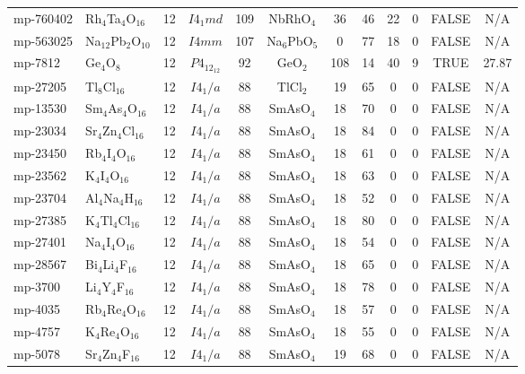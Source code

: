 {\begin{longtable}{llcccccccccc}
    mp-760402 & Rh$_{4}$Ta$_{4}$O$_{16}$ & 12    & $I4_1md$ & 109   & NbRhO$_{4}$ & 36    & 46    & 22    & 0     & FALSE & N/A \\
    mp-563025 & Na$_{12}$Pb$_{2}$O$_{10}$ & 12    & $I4mm$ & 107   & Na$_{6}$PbO$_{5}$ & 0     & 77    & 18    & 0     & FALSE & N/A \\
    mp-7812 & Ge$_{4}$O$_{8}$ & 12    & $P4_12_12$ & 92    & GeO$_{2}$ & 108   & 14    & 40    & 9     & TRUE  & 27.87  \\
    mp-27205 & Tl$_{8}$Cl$_{16}$ & 12    & $I4_1/a$ & 88    & TlCl$_{2}$ & 19    & 65    & 0     & 0     & FALSE & N/A \\
    mp-13530 & Sm$_{4}$As$_{4}$O$_{16}$ & 12    & $I4_1/a$ & 88    & SmAsO$_{4}$ & 18    & 70    & 0     & 0     & FALSE & N/A \\
    mp-23034 & Sr$_{4}$Zn$_{4}$Cl$_{16}$ & 12    & $I4_1/a$ & 88    & SmAsO$_{4}$ & 18    & 84    & 0     & 0     & FALSE & N/A \\
    mp-23450 & Rb$_{4}$I$_{4}$O$_{16}$ & 12    & $I4_1/a$ & 88    & SmAsO$_{4}$ & 18    & 61    & 0     & 0     & FALSE & N/A \\
    mp-23562 & K$_{4}$I$_{4}$O$_{16}$ & 12    & $I4_1/a$ & 88    & SmAsO$_{4}$ & 18    & 63    & 0     & 0     & FALSE & N/A \\
    mp-23704 & Al$_{4}$Na$_{4}$H$_{16}$ & 12    & $I4_1/a$ & 88    & SmAsO$_{4}$ & 18    & 52    & 0     & 0     & FALSE & N/A \\
    mp-27385 & K$_{4}$Tl$_{4}$Cl$_{16}$ & 12    & $I4_1/a$ & 88    & SmAsO$_{4}$ & 18    & 80    & 0     & 0     & FALSE & N/A \\
    mp-27401 & Na$_{4}$I$_{4}$O$_{16}$ & 12    & $I4_1/a$ & 88    & SmAsO$_{4}$ & 18    & 54    & 0     & 0     & FALSE & N/A \\
    mp-28567 & Bi$_{4}$Li$_{4}$F$_{16}$ & 12    & $I4_1/a$ & 88    & SmAsO$_{4}$ & 18    & 65    & 0     & 0     & FALSE & N/A \\
    mp-3700 & Li$_{4}$Y$_{4}$F$_{16}$ & 12    & $I4_1/a$ & 88    & SmAsO$_{4}$ & 18    & 78    & 0     & 0     & FALSE & N/A \\
    mp-4035 & Rb$_{4}$Re$_{4}$O$_{16}$ & 12    & $I4_1/a$ & 88    & SmAsO$_{4}$ & 18    & 57    & 0     & 0     & FALSE & N/A \\
    mp-4757 & K$_{4}$Re$_{4}$O$_{16}$ & 12    & $I4_1/a$ & 88    & SmAsO$_{4}$ & 18    & 55    & 0     & 0     & FALSE & N/A \\
    mp-5078 & Sr$_{4}$Zn$_{4}$F$_{16}$ & 12    & $I4_1/a$ & 88    & SmAsO$_{4}$ & 19    & 68    & 0     & 0     & FALSE & N/A \\

\end{longtable}}
